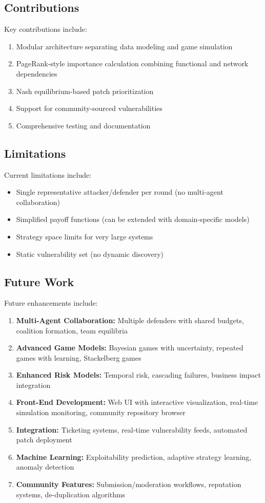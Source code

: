 \documentclass[conference]{IEEEtran}
\begin{document}
\subsection{Contributions}
Key contributions include:
\begin{enumerate}
    \item Modular architecture separating data modeling and game simulation
    \item PageRank-style importance calculation combining functional and network dependencies
    \item Nash equilibrium-based patch prioritization
    \item Support for community-sourced vulnerabilities
    \item Comprehensive testing and documentation
\end{enumerate}

\subsection{Limitations}
Current limitations include:
\begin{itemize}
    \item Single representative attacker/defender per round (no multi-agent collaboration)
    \item Simplified payoff functions (can be extended with domain-specific models)
    \item Strategy space limits for very large systems
    \item Static vulnerability set (no dynamic discovery)
\end{itemize}

\subsection{Future Work}
Future enhancements include:
\begin{enumerate}
    \item \textbf{Multi-Agent Collaboration:} Multiple defenders with shared budgets, coalition formation, team equilibria
    \item \textbf{Advanced Game Models:} Bayesian games with uncertainty, repeated games with learning, Stackelberg games
    \item \textbf{Enhanced Risk Models:} Temporal risk, cascading failures, business impact integration
    \item \textbf{Front-End Development:} Web UI with interactive visualization, real-time simulation monitoring, community repository browser
    \item \textbf{Integration:} Ticketing systems, real-time vulnerability feeds, automated patch deployment
    \item \textbf{Machine Learning:} Exploitability prediction, adaptive strategy learning, anomaly detection
    \item \textbf{Community Features:} Submission/moderation workflows, reputation systems, de-duplication algorithms
\end{enumerate}
\end{document}
